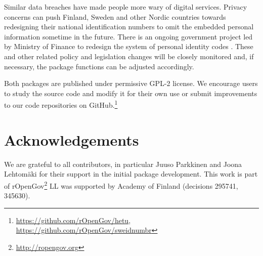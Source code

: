 Similar data breaches have made people more wary of digital services. Privacy concerns can push Finland, Sweden and other Nordic countries towards redesigning their national identification numbers to omit the embedded personal information sometime in the future. There is an ongoing government project led by Ministry of Finance to redesign the system of personal identity codes \citep{hetuvm}. These and other related policy and legislation changes will be closely monitored and, if necessary, the package functions can be adjusted accordingly.

Both packages are published under permissive GPL-2 license. We encourage users to study the source code and modify it for their own use or submit improvements to our code repositories on GitHub.\footnote{\url{https://github.com/rOpenGov/hetu}, \url{https://github.com/rOpenGov/sweidnumbr}}

\section{Acknowledgements}

We are grateful to all contributors, in particular Juuso Parkkinen and Joona Lehtomäki for their support in the initial package development. This work is part of rOpenGov\footnote{\url{http://ropengov.org}} LL was supported by Academy of Finland (decisions 295741, 345630).



\address{Pyry Kantanen\\
  Department of Computing\\
  PO Box 20014 University of Turku\\
  Finland\\
  ORCiD: 0000-0003-2853-2765\\
  }
  
\address{Måns Magnusson\\
  Department of Statistics\\
  Uppsala University\\
  Sweden\\
  ORCiD: 0000-0002-0296-2719\\
  }

\address{Leo Lahti\\
  Department of Computing\\
  PO Box 20014 University of Turku\\
  Finland\\
  ORCiD: 0000-0001-5537-637X\\
  }
